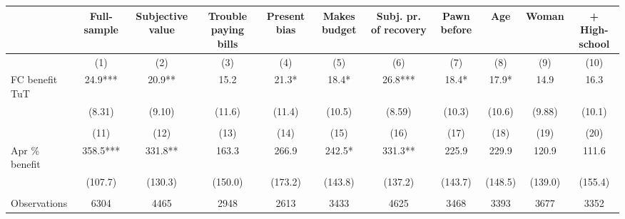 \begin{tabular}{lcccccccccc}
\toprule
      & Full-sample & Subjective value & Trouble paying bills & Present bias & Makes budget & Subj. pr. of recovery & Pawn before & Age   & Woman & + High-school \\
\midrule
      & (1)   & (2)   & (3)   & (4)   & (5)   & (6)   & (7)   & (8)   & (9)   & (10) \\
\midrule
\midrule
FC benefit TuT & 24.9*** & 20.9** & 15.2  & 21.3* & 18.4* & 26.8*** & 18.4* & 17.9* & 14.9  & 16.3 \\
      & (8.31) & (9.10) & (11.6) & (11.4) & (10.5) & (8.59) & (10.3) & (10.6) & (9.88) & (10.1) \\
      &       &       &       &       &       &       &       &       &       &  \\
\midrule
      & (11)  & (12)  & (13)  & (14)  & (15)  & (16)  & (17)  & (18)  & (19)  & (20) \\
\midrule
\midrule
Apr \% benefit & 358.5*** & 331.8** & 163.3 & 266.9 & 242.5* & 331.3** & 225.9 & 229.9 & 120.9 & 111.6 \\
      & (107.7) & (130.3) & (150.0) & (173.2) & (143.8) & (137.2) & (143.7) & (148.5) & (139.0) & (155.4) \\
      &       &       &       &       &       &       &       &       &       &  \\
\midrule
Observations & 6304  & 4465  & 2948  & 2613  & 3433  & 4625  & 3468  & 3393  & 3677  & 3352 \\
\bottomrule
\bottomrule
\end{tabular}%
